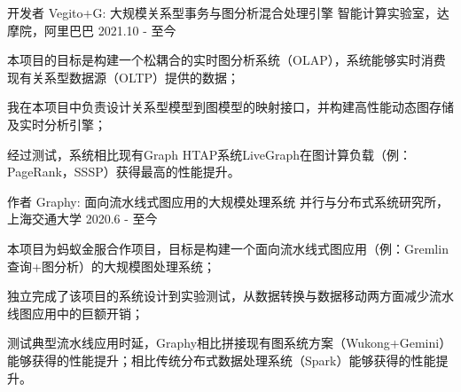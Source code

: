 



\vspace{1mm}

\begin{cventries}


\cventry
{开发者} %
{Vegito+G: 大规模关系型事务与图分析混合处理引擎} %
{智能计算实验室，达摩院，阿里巴巴} %
{2021.10 - 至今} %
{ %
	\begin{cvitems}
		  \item {本项目的目标是构建一个松耦合的实时图分析系统（OLAP），系统能够实时消费现有关系型数据源（OLTP）提供的数据；}
		  \item {我在本项目中负责设计关系型模型到图模型的映射接口，并构建高性能动态图存储及实时分析引擎；}
		 \item {经过测试，系统相比现有Graph HTAP系统LiveGraph在图计算负载（例：PageRank，SSSP）获得最高的性能提升。}
	\end{cvitems} 
}

\vspace{-3mm}

\cventry
{作者} %
{Graphy: 面向流水线式图应用的大规模处理系统} %
{并行与分布式系统研究所，上海交通大学} %
{2020.6 - 至今} %
{ %
	\begin{cvitems}
	 \item {本项目为蚂蚁金服合作项目，目标是构建一个面向流水线式图应用（例：Gremlin查询+图分析）的大规模图处理系统；}
	 \item {独立完成了该项目的系统设计到实验测试，从数据转换与数据移动两方面减少流水线图应用中的巨额开销；}
	 \item {测试典型流水线应用时延，Graphy相比拼接现有图系统方案（Wukong+Gemini）能够获得的性能提升；相比传统分布式数据处理系统（Spark）能够获得的性能提升。}
	\end{cvitems}
}

\end{cventries}

